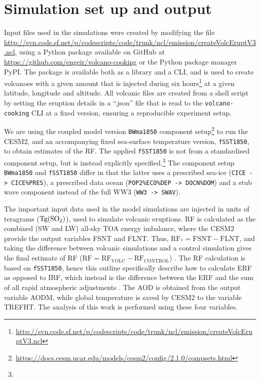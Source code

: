 \documentclass[draft]{agujournal2019}
\newcommand{\iso}[1][i]{{#1}njected \ce{SO2}}
\begin{document}
\section{Simulation set up and output}

Input files used in the simulations were created by modifying the file
\url{http://svn.code.sf.net/p/codescripts/code/trunk/ncl/emission/createVolcEruptV3.ncl},
using a Python package available on GitHub at
\url{https://github.com/engeir/volcano-cooking} or the Python package manager PyPI\@.
The package is available both as a library and a CLI, and is used to create volcanoes
with a given  amount that is injected during six
hours\footnote{\url{http://svn.code.sf.net/p/codescripts/code/trunk/ncl/emission/createVolcEruptV3.ncl}}
at a given latitude, longitude and altitude. All volcanic  files are created
from a shell script by setting the eruption details in a ``.json'' file that is read to
the \texttt{volcano-cooking} CLI at a fixed version, ensuring a reproducible experiment
setup.

We are using the coupled model version \texttt{BWma1850} component
setup\footnote{\url{https://docs.cesm.ucar.edu/models/cesm2/config/2.1.0/compsets.html}}
to run the CESM2, and an accompanying fixed sea-surface temperature version,
\texttt{fSST1850}, to obtain estimates of the RF. The applied \texttt{fSST1850} is not
from a standardised component setup, but is instead explicitly
specified.\footnote{\fssturl} The component setup \texttt{BWma1850} and
\texttt{fSST1850} differ in that the latter uses a prescribed sea-ice (\texttt{CICE ->
  CICE\%PRES}), a prescribed data ocean (\texttt{POP2\%ECO\%DEP -> DOCN\%DOM}) and a stub
wave component instead of the full WW3 (\texttt{WW3 -> SWAV}).

The important input data used in the model simulations are \iso{} in units of teragrams
(\(\si{\tera\gram(\ce{SO2})}\)), used to simulate volcanic eruptions. RF is calculated
as the combined (SW and LW) all-sky TOA energy imbalance, where the CESM2 provide the
output variables FSNT and FLNT. Thus, \(\mathrm{RF_*}= \mathrm{FSNT} - \mathrm{FLNT}\),
and taking the difference between volcanic simulations and a control simulation gives
the final estimate of RF (\(\mathrm{RF}=\mathrm{RF_{VOLC}}-\mathrm{RF_{CONTROL}}\))
\cite{marshall2020}. The RF calculation is based on \texttt{fSST1850}, hence this
outline specifically describe how to calculate ERF as opposed to IRF, which instead is
the difference between the ERF and the sum of all rapid atmospheric adjustments
\cite{marshall2020,smith2018}. The AOD is obtained from the output variable AODM, while
global temperature is saved by CESM2 to the variable TREFHT. The analysis of this work
is performed using these four variables.
\end{document}
